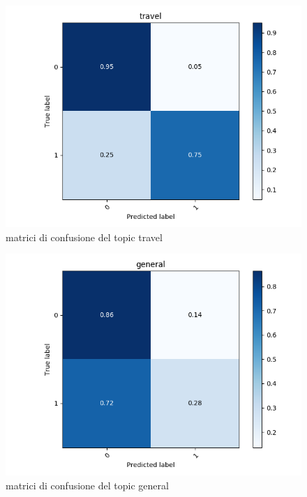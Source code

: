 \begin{figure}[h!t]
    \centering
    \includegraphics{Figure/confMatr/mtr_travel.png}
    \caption{matrici di confusione del topic travel}
    \label{fig:mtrconf_sim_t}
\end{figure}
\FloatBarrier


\begin{figure}[h!t]
    \centering
    \includegraphics{Figure/confMatr/mtr_general.png}
    \caption{matrici di confusione del topic general}
    \label{fig:mtrconf_sim_g}
\end{figure}
\FloatBarrier